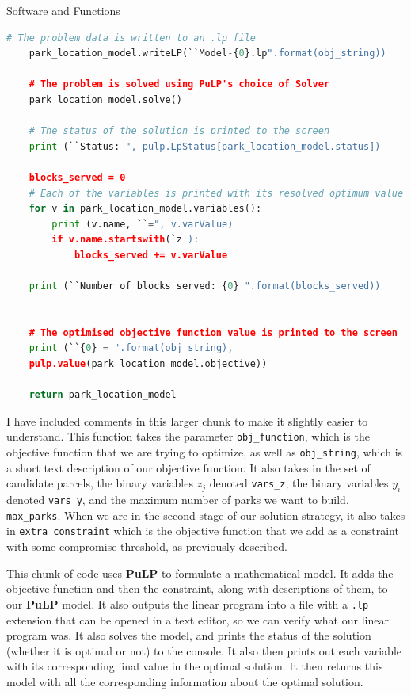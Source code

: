 \documentclass[12pt]{pom_thesis}
\theoremstyle{definition}
\begin{document}
\begin{chapter}{Software and Functions}
\begin{lstlisting}[language = Python, caption = Constructs and solves our linear programs., xleftmargin = -50pt]
	# The problem data is written to an .lp file
	park_location_model.writeLP(``Model-{0}.lp".format(obj_string))

	# The problem is solved using PuLP's choice of Solver
	park_location_model.solve()

	# The status of the solution is printed to the screen
	print (``Status: ", pulp.LpStatus[park_location_model.status])

	blocks_served = 0
	# Each of the variables is printed with its resolved optimum value
	for v in park_location_model.variables():
		print (v.name, ``=", v.varValue)
		if v.name.startswith(`z'):
			blocks_served += v.varValue

	print (``Number of blocks served: {0} ".format(blocks_served))


	# The optimised objective function value is printed to the screen
	print (``{0} = ".format(obj_string), 
	pulp.value(park_location_model.objective))

	return park_location_model	
\end{lstlisting}

\indent	I have included comments in this larger chunk to make it slightly easier to understand. This function takes the parameter \verb-obj_function-, which is the objective function that we are trying to optimize, as well as \verb-obj_string-, which is a short text description of our objective function. It also takes in the set of candidate parcels, the binary variables $z_j$ denoted \verb-vars_z-, the binary variables $y_i$ denoted \verb-vars_y-, and the maximum number of parks we want to build, \verb-max_parks-. When we are in the second stage of our solution strategy, it also takes in \verb-extra_constraint- which is the objective function that we add as a constraint with some compromise threshold, as previously described.

This chunk of code uses \textbf{PuLP} to formulate a mathematical model. It adds the objective function and then the constraint, along with descriptions of them, to our \textbf{PuLP} model. It also outputs the linear program into a file with a \verb-.lp- extension that can be opened in a text editor, so we can verify what our linear program was. It also solves the model, and prints the status of the solution (whether it is optimal or not) to the console. It also then prints out each variable with its corresponding final value in the optimal solution. It then returns this model with all the corresponding information about the optimal solution. \\ \\


\end{chapter}
\end{document}
